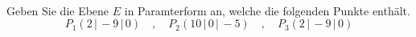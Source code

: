\begin{aufgabe} ~ \\ 
Geben Sie die Ebene $E$ in Paramterform an, welche die folgenden Punkte enthält.\[P_1( 2\,|\,-9\,|\,0) \quad,\quad P_2( 10\,|\,0\,|\,-5) \quad,\quad P_3( 2\,|\,-9\,|\,0)\]\end{aufgabe} 

